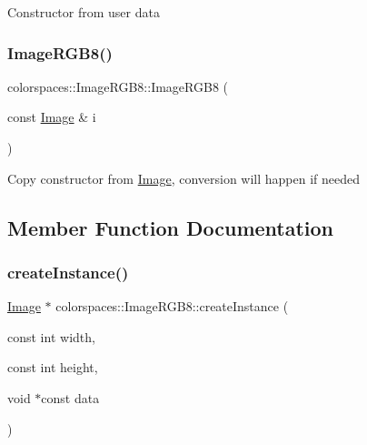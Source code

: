 Constructor from user data \mbox{\label{classcolorspaces_1_1_image_r_g_b8_acab57fcfbc442b4106636d174fea3b7c}} 
\subsubsection{\texorpdfstring{Image\+R\+G\+B8()}{ImageRGB8()}\hspace{0.1cm}{\footnotesize\ttfamily [3/3]}}
{\footnotesize\ttfamily colorspaces\+::\+Image\+R\+G\+B8\+::\+Image\+R\+G\+B8 (\begin{DoxyParamCaption}\item[{const \hyperlink{classcolorspaces_1_1_image}{Image} \&}]{i }\end{DoxyParamCaption})}

Copy constructor from \hyperlink{classcolorspaces_1_1_image}{Image}, conversion will happen if needed 

\subsection{Member Function Documentation}
\mbox{\label{classcolorspaces_1_1_image_r_g_b8_ab71cd6e6837845cd0c43ac03e3a86297}} 
\subsubsection{\texorpdfstring{create\+Instance()}{createInstance()}}
{\footnotesize\ttfamily \hyperlink{classcolorspaces_1_1_image}{Image} $\ast$ colorspaces\+::\+Image\+R\+G\+B8\+::create\+Instance (\begin{DoxyParamCaption}\item[{const int}]{width,  }\item[{const int}]{height,  }\item[{void $\ast$const}]{data }\end{DoxyParamCaption})\hspace{0.3cm}{\ttfamily [static]}}

